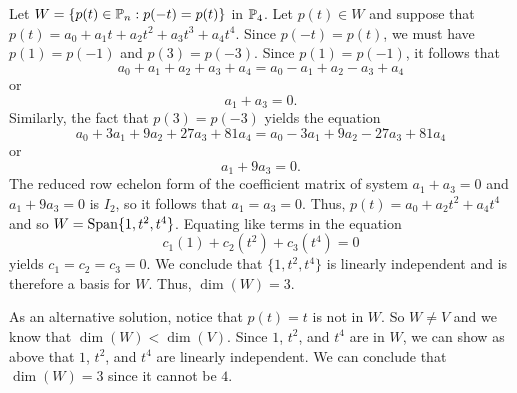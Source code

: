 \begin{example}
	\item Let $W = \{p(t) \in \mathbb{P}_n : p(-t) = p(t)\}$ in $\mathbb{P}_4$. Let $p(t) \in W$ and suppose that $p(t) = a_0 + a_1t+a_2t^2+a_3t^3+a_4t^4$.  Since $p(-t)=p(t)$, we must have $p(1) = p(-1)$ and $p(3) = p(-3)$. Since $p(1) = p(-1)$, it follows that 
	\[a_0+a_1+a_2+a_3+a_4 = a_0-a_1+a_2-a_3+a_4\]
	or
	\[a_1+a_3 = 0.\]
	Similarly, the fact that $p(3) = p(-3)$ yields the equation
	\[a_0+3a_1+9a_2+27a_3+81a_4 = a_0-3a_1+9a_2-27a_3+81a_4\]
	or
	\[a_1+9a_3 = 0.\]
	The reduced row echelon form of the coefficient matrix of system $a_1+a_3 = 0$ and $a_1+9a_3 = 0$ is $I_2$, so it follows that $a_1=a_3=0$. Thus, $p(t) = a_0 + a_2t^2+a_4t^4$ and so $W = \text{Span}\{1, t^2, t^4\}$. Equating like terms in the equation 
	\[c_1(1) + c_2(t^2) + c_3(t^4) = 0\]
	yields $c_1=c_2=c_3=0$. We conclude that $\{1,t^2,t^4\}$ is linearly independent and is therefore a basis for $W$. Thus, $\dim(W) = 3$. 

As an alternative solution, notice that $p(t) = t$ is not in $W$. So $W \neq V$ and we know that $\dim(W) < \dim(V)$. Since $1$, $t^2$, and $t^4$ are in $W$, we can show as above that $1$, $t^2$, and $t^4$ are linearly independent. We can conclude that $\dim(W)=3$ since it cannot be $4$. 
	\ea
	
\end{example}



